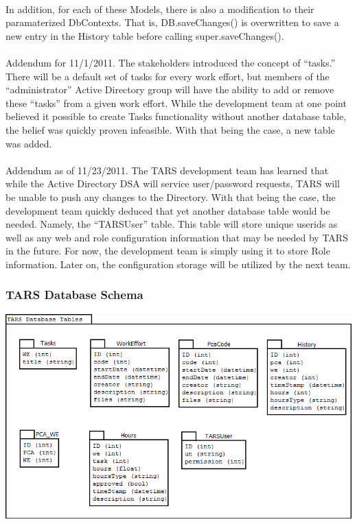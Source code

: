 \documentclass[letterpaper]{article}
\begin{document}
\\
In addition, for each of these Models, there is also a modification to their paramaterized DbContexts. That is, DB.saveChanges() is overwritten to save a new entry in the History table before calling super.saveChanges(). \\
\\
Addendum for 11/1/2011. The stakeholders introduced the concept of ``tasks.'' There will be a default set of tasks for every work effort, but members of the ``administrator'' Active Directory group will have the ability to add or remove these ``tasks'' from a given work effort. While the development team at one point believed it possible to create Tasks functionality without another database table, the belief was quickly proven infeasible. With that being the case, a new table was added.\\
\\
Addendum as of 11/23/2011. The TARS development team has learned that while the Active Directory DSA will service user/password requests, TARS will be unable to push any changes to the Directory. With that being the case, the development team quickly deduced that yet another database table would be needed. Namely, the ``TARSUser'' table. This table will store unique userids as well as any web and role configuration information that may be needed by TARS in the future. For now, the development team is simply using it to store Role information. Later on, the configuration storage will be utilized by the next team.

\subsubsection{TARS Database Schema}
\begin{centering}
\includegraphics[scale=0.64]{schema.png}
\end{centering}
\end{document}
